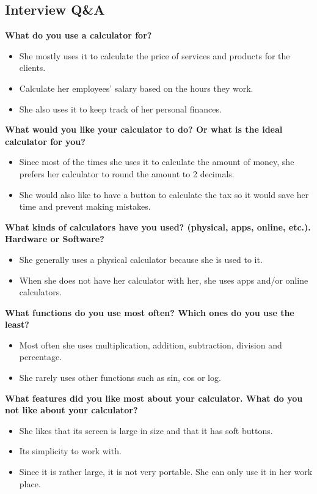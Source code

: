 \documentclass{article}
\begin{document}
\subsection*{Interview Q\&A}
\textbf{What do you use a calculator for?}
\begin{itemize}
\itemsep0em 
\item She mostly uses it to calculate the price of services and products for the clients. 
\item Calculate her employees’ salary based on the hours they work.
\item She also uses it to keep track of her personal finances.
\end{itemize}

\textbf{What would you like your calculator to do? Or what is the ideal calculator for you?}
\begin{itemize}
\itemsep0em 
\item Since most of the times she uses it to calculate the amount of money, she prefers her calculator to round the amount to 2 decimals.
\item She would also like to have a button to calculate the tax so it would save her time and prevent making mistakes.
\end{itemize}

\textbf{What kinds of calculators have you used? (physical, apps, online, etc.). Hardware or Software?}
\begin{itemize}
\itemsep0em 
\item She generally uses a physical calculator because she is used to it.
\item When she does not have her calculator with her, she uses apps and/or online calculators.
\end{itemize}

\textbf{What functions do you use most often? Which ones do you use the least?}
\begin{itemize}
\itemsep0em 
\item Most often she uses multiplication, addition, subtraction, division and percentage. 
\item She rarely uses other functions such as sin, cos or log.
\end{itemize}

\textbf{What features did you like most about your calculator. What do you not like about your calculator?}
\begin{itemize}
\itemsep0em 
\item She likes that its screen is large in size and that it has soft buttons.
\item Its simplicity to work with. 
\item Since it is rather large, it is not very portable. She can only use it in her work place.
\end{itemize}
\end{document}
